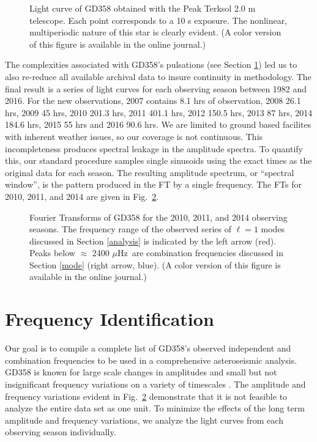 \documentclass[12pt,preprint]{aastex}
\newcommand{\muHz}{\mbox{$\mu$Hz}}
\begin{document}
\begin{figure}
\caption{Light curve of GD358 obtained with the Peak Terksol 2.0 m telescope.  Each point corresponds 
to a 10 s exposure. The nonlinear, multiperiodic nature of this star is clearly evident.
(A color version of this figure is available in the online journal.)
\label{tersk}
}
\end{figure}

The complexities associated with GD358's pulsations (see Section \ref{freq}) led us to also 
re-reduce all available archival data \citep{Provencal09, Bradley04, Kepler03, Winget94, Winget82} to
insure continuity in methodology. The final result is a series of light curves 
for each observing season between 1982 and 2016. 
For the new observations, 2007 contains 8.1 hrs of observation, 2008 26.1 hrs, 2009 45 hrs, 
2010 201.3 hrs, 2011 401.1 hrs, 2012 150.5 hrs, 2013 87 hrs, 2014 184.6 hrs, 2015 55 hrs and 2016 90.6 hrs. 
We are limited to ground based facilites with inherent weather issues, so our coverage is not continuous. This 
incompleteness produces spectral leakage in the amplitude spectra. To quantify this, our standard procedure 
samples single sinusoids using the exact times as the original data for each season. The resulting amplitude spectrum, 
or ``spectral window'', is the pattern produced in the FT by a single frequency. 
The FTs for 2010, 2011, and 2014 are given in Fig.~\ref{fts}.


\begin{figure}
\caption{Fourier Transforms of GD358 for the 2010, 2011, and 2014 observing seasons.
The frequency range of the observed series of $\ell=1$ modes discussed in Section \ref{analysis} 
is indicated by the left arrow (red).  Peaks below $\approx$ 2400 \muHz\ are combination 
frequencies discussed in Section \ref{mode} (right arrow, blue). 
(A color version of this figure is available in the online journal.)
\label{fts}
}
\end{figure}

\section{Frequency Identification}\label{freq}
 
Our goal is to compile a complete list of GD358's observed independent and combination frequencies 
to be used in a comprehensive asteroseismic analysis. GD358 is known for large scale changes in 
amplitudes and small but not insignificant frequency variations on a variety of timescales 
\citep{Provencal09, Kepler03}.  The amplitude and frequency variations evident in Fig.~\ref{fts} demonstrate that 
it is not feasible to analyze the entire data set as one unit. To minimize the effects of the long term  
amplitude and frequency variations, we analyze the light curves from each observing season individually.
\end{document}
